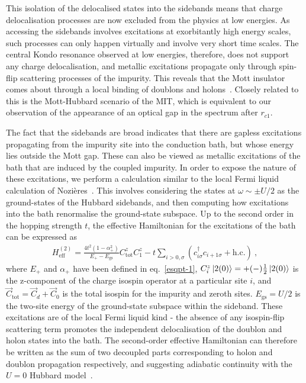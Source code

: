 This isolation of the delocalised states into the sidebands means that charge delocalisation processes are now excluded from the physics at low energies. As accessing the sidebands involves excitations at exorbitantly high energy scales, such processes can only happen virtually and involve very short time scales. The central Kondo resonance observed at low energies, therefore, does not support any charge delocalisation, and metallic excitations propagate only through spin-flip scattering processes of the impurity. This reveals that the Mott insulator comes about through a local binding of doublons and holons~\cite{Mott_1949,kohn1964theory,castellani_1979}. Closely related to this is the Mott-Hubbard scenario of the MIT, which is equivalent to our observation of the appearance of an optical gap in the spectrum after \(r_{c1}\).

The fact that the sidebands are broad indicates that there are gapless excitations propagating from the impurity site into the conduction bath, but whose energy lies outside the Mott gap. These can also be viewed as metallic excitations of the bath that are induced by the coupled impurity. In order to expose the nature of these excitations, we perform a calculation similar to the local Fermi liquid calculation of Nozières~\cite{nozieres1974fermi}. This involves considering the states at \(\omega \sim \pm U/2\) as the ground-states of the Hubbard sidebands, and then computing how excitations into the bath renormalise the ground-state subspace. Up to the second order in the hopping strength \(t\), the effective Hamiltonian for the excitations of the bath can be expressed as
\begin{eqnarray}
H_\text{eff}^{(2)} = \frac{4t^2(1 - \alpha_+^2)}{E_+ - E_\text{gs}}C_\text{tot}^z C_1^z - t\sum_{i >0,\sigma}\left(c^\dagger_{i\sigma}c_{i+1\sigma} + \text{h.c.}\right) ~,\label{hodoLFL}
\end{eqnarray}
where \(E_+\) and \(\alpha_+\) have been defined in eq.~\eqref{esqpt-1}, \(C_i^z\ket{2(0)} = +(-)\frac{1}{2}\ket{2(0)}\) is the z-component of the charge isospin operator at a particular site $i$, and \(\vec C_\text{tot} = \vec C_d + \vec C_0\) is the total isospin for the impurity and zeroth sites.
\(E_\text{gs} = U/2\) is the two-site energy of the ground-state subspace within the sideband.
These excitations are of the local Fermi liquid kind - the absence of any isospin-flip scattering term promotes the independent delocalisation of the doublon and holon states into the bath. The second-order effective Hamiltonian can therefore be written as the sum of two decoupled parts corresponding to holon and doublon propagation respectively, and suggesting adiabatic continuity with the \(U=0\) Hubbard model~\cite{hrk_1990_prl}. 

